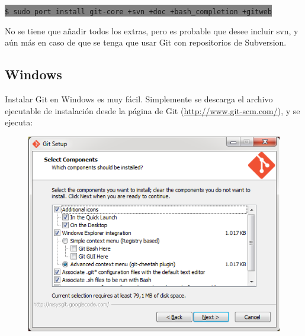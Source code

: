 \documentclass[12pt, spanish, oneside, onecolumn, a4paper]{report}
\newcommand{\shellcmd}[1]{ %

  \colorbox{Gray}{
    \indent\indent\texttt{\footnotesize\$ #1}
  }

}
\begin{document}
\shellcmd{sudo port install git-core +svn +doc +bash\_completion +gitweb}

No se tiene que añadir todos los extras, pero es probable que desee incluir svn, y aún más en caso de que se tenga que usar Git con repositorios de Subversion. 

\subsection{Windows} 
\label{sec:installwindows}

Instalar Git en Windows es muy fácil. Simplemente se descarga el archivo ejecutable de instalación desde la página de Git (\url{http://www.git-scm.com/}), y se ejecuta:

\begin{figure}[hb] 
  \begin{center} 
    \includegraphics[width=.6\textwidth,keepaspectratio=true]{3.png} 
  \end{center} 
\end{figure} 
\clearpage
\end{document}
